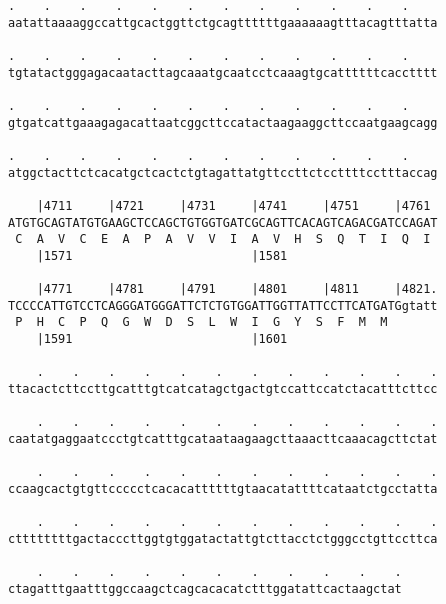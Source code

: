 \documentclass{article}
\begin{document}
\begin{Verbatim}
.    .    .    .    .    .    .    .    .    .    .    .    
aatattaaaaggccattgcactggttctgcagttttttgaaaaaagtttacagtttatta
                                                            
.    .    .    .    .    .    .    .    .    .    .    .    
tgtatactgggagacaatacttagcaaatgcaatcctcaaagtgcattttttcacctttt
                                                            
.    .    .    .    .    .    .    .    .    .    .    .    
gtgatcattgaaagagacattaatcggcttccatactaagaaggcttccaatgaagcagg
                                                            
.    .    .    .    .    .    .    .    .    .    .    .    
atggctacttctcacatgctcactctgtagattatgttccttctccttttcctttaccag
                                                            
    |4711     |4721     |4731     |4741     |4751     |4761 
ATGTGCAGTATGTGAAGCTCCAGCTGTGGTGATCGCAGTTCACAGTCAGACGATCCAGAT
 C  A  V  C  E  A  P  A  V  V  I  A  V  H  S  Q  T  I  Q  I 
    |1571                         |1581                     
  
    |4771     |4781     |4791     |4801     |4811     |4821.
TCCCCATTGTCCTCAGGGATGGGATTCTCTGTGGATTGGTTATTCCTTCATGATGgtatt
 P  H  C  P  Q  G  W  D  S  L  W  I  G  Y  S  F  M  M       
    |1591                         |1601                     
  
    .    .    .    .    .    .    .    .    .    .    .    .
ttacactcttccttgcatttgtcatcatagctgactgtccattccatctacatttcttcc
                                                            
    .    .    .    .    .    .    .    .    .    .    .    .
caatatgaggaatccctgtcatttgcataataagaagcttaaacttcaaacagcttctat
                                                            
    .    .    .    .    .    .    .    .    .    .    .    .
ccaagcactgtgttccccctcacacattttttgtaacatattttcataatctgcctatta
                                                            
    .    .    .    .    .    .    .    .    .    .    .    .
cttttttttgactacccttggtgtggatactattgtcttacctctgggcctgttccttca
                                                            
    .    .    .    .    .    .    .    .    .    .    .
ctagatttgaatttggccaagctcagcacacatctttggatattcactaagctat
                                                       
                                                       
 

\end{Verbatim}
\end{document}
